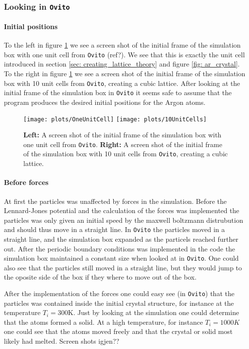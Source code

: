 \documentclass[11pt,a4wide]{article}
\begin{document}
\subsubsection*{Looking in \texttt{Ovito}}
\paragraph{Initial positions}
To the left in figure \ref{fig: unitCellsOvito} we see a screen shot of the initial frame of the simulation box with one unit cell from \texttt{Ovito} (ref?). We see that this is exactly the unit cell introduced in section \ref{sec: creating_lattice_theory} and figure \ref{fig: ar_crystal}. To the right in figure \ref{fig: unitCellsOvito} we see a screen shot of the initial frame of the simulation box with 10 unit cells from \texttt{Ovito}, creating a cubic lattice. After looking at the initial frame of the simulation box in \texttt{Ovito} it seems safe to assume that the program produces the desired initial positions for the Argon atoms. 

\begin{figure}[htp]
\centering
\texttt{[image: plots/OneUnitCell]}
\texttt{[image: plots/10UnitCells]}
\caption{\textbf{Left:} A screen shot of the initial frame of the simulation box with one unit cell from \texttt{Ovito}. \textbf{Right:} A screen shot of the initial frame of the simulation box with 10 unit cells from \texttt{Ovito}, creating a cubic lattice.}
\label{fig: unitCellsOvito}
\end{figure}

\paragraph{Before forces}
At first the particles was unaffected by forces in the simulation. Before the Lennard-Jones potential and the calculation of the forces was implemented the particles was only given an initial speed by the maxwell boltzmann distrubution and should thus move in a straight line. In \texttt{Ovito} the particles moved in a straight line, and the simulation box expanded as the particels reached further out. After the periodic boundary conditions was implemented in the code the simulation box maintained a constant size when looked at in \texttt{Ovito}. One could also see that the particles still moved in a straight line, but they would jump to the oposite side of the box if they where to move out of the box. 

After the implementation of the forces one could easy see (in \texttt{Ovito}) that the particles was contained inside the initial crystal structure, for instance at the temperature $T_i =300$K. Just by looking at the simulation one could determine that the atoms formed a solid. At a high temperature, for instance $T_i = 1000K$ one could see that the atoms moved freely and that the crystal or solid most likely had melted. Screen shots igjen??
\end{document}
